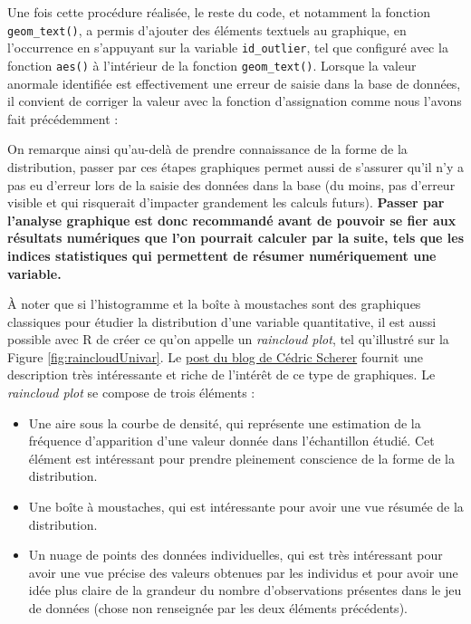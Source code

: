 \documentclass[
  french,
]{book}
\newenvironment{Shaded}{\begin{snugshade}}{\end{snugshade}}
\newcommand{\CommentTok}[1]{\textcolor[rgb]{0.56,0.35,0.01}{\textit{#1}}}
\newcommand{\DecValTok}[1]{\textcolor[rgb]{0.00,0.00,0.81}{#1}}
\newcommand{\FloatTok}[1]{\textcolor[rgb]{0.00,0.00,0.81}{#1}}
\newcommand{\NormalTok}[1]{#1}
\newcommand{\OperatorTok}[1]{\textcolor[rgb]{0.81,0.36,0.00}{\textbf{#1}}}
\newcommand{\StringTok}[1]{\textcolor[rgb]{0.31,0.60,0.02}{#1}}
\providecommand{\tightlist}{%
  \setlength{\itemsep}{0pt}\setlength{\parskip}{0pt}}
\begin{document}
Une fois cette procédure réalisée, le reste du code, et notamment la fonction \texttt{geom\_text()}, a permis d'ajouter des éléments textuels au graphique, en l'occurrence en s'appuyant sur la variable \texttt{id\_outlier}, tel que configuré avec la fonction \texttt{aes()} à l'intérieur de la fonction \texttt{geom\_text()}. Lorsque la valeur anormale identifiée est effectivement une erreur de saisie dans la base de données, il convient de corriger la valeur avec la fonction d'assignation comme nous l'avons fait précédemment :

\begin{Shaded}
\end{Shaded}

On remarque ainsi qu'au-delà de prendre connaissance de la forme de la distribution, passer par ces étapes graphiques permet aussi de s'assurer qu'il n'y a pas eu d'erreur lors de la saisie des données dans la base (du moins, pas d'erreur visible et qui risquerait d'impacter grandement les calculs futurs). \textbf{Passer par l'analyse graphique est donc recommandé avant de pouvoir se fier aux résultats numériques que l'on pourrait calculer par la suite, tels que les indices statistiques qui permettent de résumer numériquement une variable.}

À noter que si l'histogramme et la boîte à moustaches sont des graphiques classiques pour étudier la distribution d'une variable quantitative, il est aussi possible avec R de créer ce qu'on appelle un \emph{raincloud plot}, tel qu'illustré sur la Figure \ref{fig:raincloudUnivar}. Le \href{https://www.cedricscherer.com/2021/06/06/visualizing-distributions-with-raincloud-plots-and-how-to-create-them-with-ggplot2/}{post du blog de Cédric Scherer} fournit une description très intéressante et riche de l'intérêt de ce type de graphiques. Le \emph{raincloud plot} se compose de trois éléments :

\begin{itemize}
\tightlist
\item
  Une aire sous la courbe de densité, qui représente une estimation de la fréquence d'apparition d'une valeur donnée dans l'échantillon étudié. Cet élément est intéressant pour prendre pleinement conscience de la forme de la distribution.
\item
  Une boîte à moustaches, qui est intéressante pour avoir une vue résumée de la distribution.
\item
  Un nuage de points des données individuelles, qui est très intéressant pour avoir une vue précise des valeurs obtenues par les individus et pour avoir une idée plus claire de la grandeur du nombre d'observations présentes dans le jeu de données (chose non renseignée par les deux éléments précédents).
\end{itemize}
\end{document}
